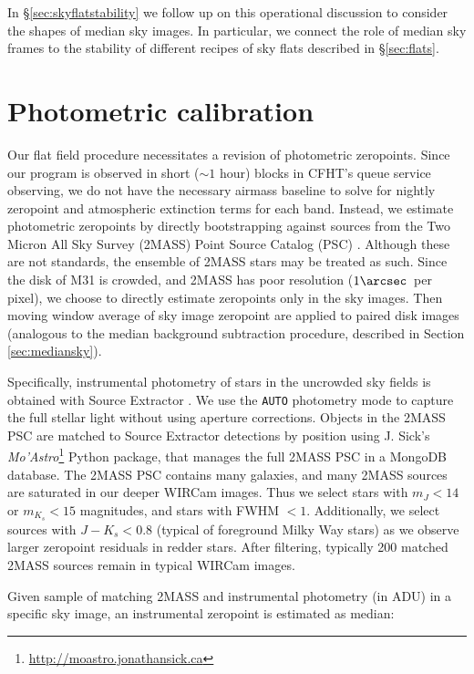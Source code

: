 \documentclass[iop]{emulateapj}
\newcommand{\sw}[1]{\textit{#1}} %
\newcommand{\Sec}[1]{\S\ref{sec:#1}}  %
\begin{document}
In \Sec{skyflatstability} we follow up on this operational discussion to consider the shapes of median sky images. In particular, we connect the role of median sky frames to the stability of different recipes of sky flats described in \Sec{flats}.

\section{Photometric calibration}
\label{sec:photocal}

Our flat field procedure necessitates a revision of photometric zeropoints.
Since our program is observed in short ($\sim 1$ hour) blocks in CFHT's queue service observing, we do not have the necessary airmass baseline to solve for nightly zeropoint and atmospheric extinction terms for each band.
Instead, we estimate photometric zeropoints by directly bootstrapping against sources from the Two Micron All Sky Survey (2MASS) Point Source Catalog (PSC) \citep{Skrutskie:2006}.
Although these are not standards, the ensemble of 2MASS stars may be treated as such.
Since the disk of M31 is crowded, and 2MASS has poor resolution ($1\arcsec$~per pixel), we choose to directly estimate zeropoints only in the sky images.
Then moving window average of sky image zeropoint are applied to paired disk images (analogous to the median background subtraction procedure, described in Section \ref{sec:mediansky}).

Specifically, instrumental photometry of stars in the uncrowded sky fields is obtained with Source Extractor \citep{Bertin:1996}.
We use the \texttt{AUTO} photometry mode to capture the full stellar light without using aperture corrections.
Objects in the 2MASS PSC are matched to Source Extractor detections by position using J. Sick's \sw{Mo'Astro}\footnote{\url{http://moastro.jonathansick.ca}} Python package, that manages the full 2MASS PSC in a MongoDB database.
The 2MASS PSC contains many galaxies, and many 2MASS sources are saturated in our deeper WIRCam images.
Thus we select stars with $m_J < 14$ or $m_{K_s} < 15$ magnitudes, and stars with FWHM $<1$\arcsec.
Additionally, we select sources with $J-K_s < 0.8$ (typical of foreground Milky Way stars) as we observe larger zeropoint residuals in redder stars.
After filtering, typically 200 matched 2MASS sources remain in typical WIRCam images.

Given sample of matching 2MASS and instrumental photometry (in ADU) in a specific sky image, an instrumental zeropoint is estimated as median:
\end{document}
